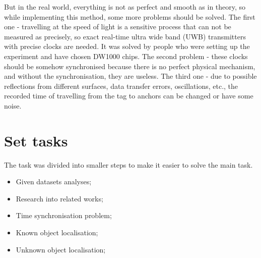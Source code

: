 \documentclass[journal]{IEEEtran}
\begin{document}
But in the real world, everything is not as perfect and smooth as in theory, so while implementing this method, some more problems should be solved.
The first one - travelling at the speed of light is a sensitive process that can not be measured as precisely, so exact real-time ultra wide band (UWB) transmitters with precise clocks are needed. 
It was solved by people who were setting up the experiment and have chosen DW1000 chips.
The second problem - these clocks should be somehow synchronised because there is no perfect physical mechanism, and without the synchronisation, they are useless.
The third one - due to possible reflections from different surfaces, data transfer errors, oscillations, etc., the recorded time of travelling from the tag to anchors can be changed or have some noise.

\section{Set tasks}
\label{sec:set_tasks}
The task was divided into smaller steps to make it easier to solve the main task.
\begin{itemize}
    \item Given datasets analyses;
    \item Research into related works;
    \item Time synchronisation problem;
    \item Known object localisation;
    \item Unknown object localisation;
\end{itemize}

\end{document}

